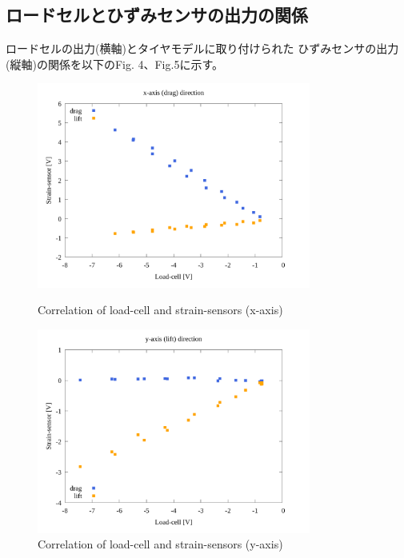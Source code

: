 \documentclass[twocolumn,a4j]{jsarticle}
\begin{document}
\subsection{ロードセルとひずみセンサの出力の関係}
ロードセルの出力(横軸)とタイヤモデルに取り付けられた
ひずみセンサの出力(縦軸)の関係を以下のFig. 4、Fig.5に示す。
\begin{figure}[htbp]
    \footnotesize
    \begin{center}
        \includegraphics[width=90mm]{images/05_strainsensor-loadcell_x.png}
        \caption{Correlation of load-cell and strain-sensors (x-axis)}
        \includegraphics[width=90mm]{images/06_strainsensor-loadcell_y.png}
        \caption{Correlation of load-cell and strain-sensors (y-axis)}
    \end{center}
\end{figure}

\newpage
\end{document}

